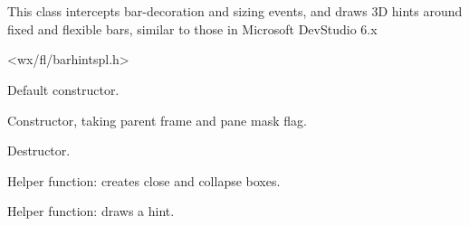 %
%


\section{}\label{cbbarhintsplugin}


This class intercepts bar-decoration and sizing events, and draws 3D hints
around fixed and flexible bars, similar to those in Microsoft DevStudio 6.x




<wx/fl/barhintspl.h>




\label{cbbarhintsplugincbbarhintsplugin}


Default constructor.



Constructor, taking parent frame and pane mask flag.


\label{cbbarhintsplugindtor}


Destructor.


\label{cbbarhintsplugincreateboxes}


Helper function: creates close and collapse boxes.


\label{cbbarhintsplugindodrawhint}


Helper function: draws a hint.


\label{cbbarhintsplugindraw3dbox}


